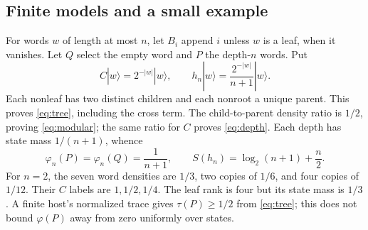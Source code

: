 \subsection{Finite models and a small example}
For words $w$ of length at most $n$, let $B_i$ append $i$ unless $w$
is a leaf, when it vanishes. Let $Q$ select the empty word and $P$ the
depth-$n$ words. Put
\begin{equation}\label{eq:treeh}
 C|w\rangle=2^{-|w|}|w\rangle,\qquad
 h_n|w\rangle=\frac{2^{-|w|}}{n+1}|w\rangle.
\end{equation}
Each nonleaf has two distinct children and each nonroot a unique parent.
This proves \eqref{eq:tree}, including the cross term.
The child-to-parent density ratio is $1/2$, proving
\eqref{eq:modular}; the same ratio for $C$ proves \eqref{eq:depth}.
Each depth has state mass $1/(n+1)$, whence
\begin{equation}\label{eq:treeentropy}
 \varphi_n(P)=\varphi_n(Q)=\frac1{n+1},\qquad
 S(h_n)=\log_2(n+1)+\frac n2.
\end{equation}
For $n=2$, the seven word densities are $1/3$, two copies of $1/6$,
and four copies of $1/12$. Their $C$ labels are $1,1/2,1/4$.
The leaf rank is four but its state mass is $1/3$.
A finite host's normalized trace gives $\tau(P)\geq1/2$ from
\eqref{eq:tree}; this does not bound $\varphi(P)$ away from zero
uniformly over states.
